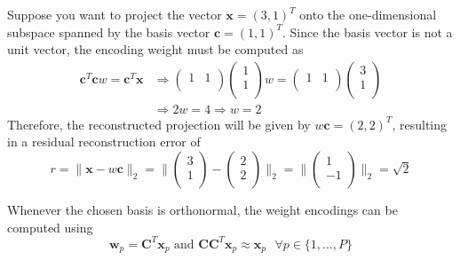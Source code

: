 \documentclass{report}
\begin{document}
\begin{examplebox}
    Suppose you want to project the vector $\displaystyle \mathbf{x} = (3, 1)^T$ onto the one-dimensional subspace spanned by the basis vector $\displaystyle \mathbf{c} = (1, 1)^T$. \newline
    Since the basis vector is not a unit vector, the encoding weight must be computed as
    \begin{align*}
        \mathbf{c}^T\mathbf{c}w = \mathbf{c}^T\mathbf{x} &\Rightarrow \begin{pmatrix}
            1 & 1 \\
        \end{pmatrix}\begin{pmatrix}
            1 \\
            1 \\
        \end{pmatrix}w = \begin{pmatrix}
            1 & 1 \\
        \end{pmatrix}\begin{pmatrix}
            3 \\
            1 \\
        \end{pmatrix} \\
        &\Rightarrow 2w = 4 \Rightarrow w = 2
    \end{align*}
    Therefore, the reconstructed projection will be given by $\displaystyle w\mathbf{c} = (2, 2)^T$, resulting in a residual reconstruction error of
    \[r = \lVert\mathbf{x} - w\mathbf{c}\rVert_2 = \bigg\lVert \begin{pmatrix}
        3 \\
        1 \\
    \end{pmatrix} - \begin{pmatrix}
        2 \\
        2 \\
    \end{pmatrix}\bigg\rVert_2 = \bigg\lVert\begin{pmatrix}
        1 \\
        -1 \\
    \end{pmatrix}\bigg\rVert_2 = \sqrt{2}\]
\end{examplebox}
\noindent Whenever the chosen basis is orthonormal, the weight encodings can be computed using
\[\mathbf{w}_p = \mathbf{C}^T\mathbf{x}_p \text{ and } \mathbf{CC}^T\mathbf{x}_p \approx \mathbf{x}_p \text{ } \forall p \in \{1, \dots, P\}\]
\end{document}
